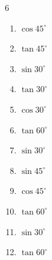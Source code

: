\begin{multicols}{6}
\begin{enumerate}
  \item $\displaystyle \cos{45^\circ}$


  \item $\displaystyle \tan{45^\circ}$

        \phantom{$\displaystyle =1$}

  \item $\displaystyle \sin{30^\circ}$


  \item $\displaystyle \tan{30^\circ}$


  \item $\displaystyle \cos{30^\circ}$


\columnbreak %

\resetques

  \item $\displaystyle \tan{60^\circ}$


  \item $\displaystyle \sin{30^\circ}$


  \item $\displaystyle \sin{45^\circ}$


  \item $\displaystyle \cos{45^\circ}$


  \item $\displaystyle \tan{60^\circ}$


  \item $\displaystyle \sin{30^\circ}$


  \item $\displaystyle \tan{60^\circ}$



\end{enumerate}
\end{multicols}

